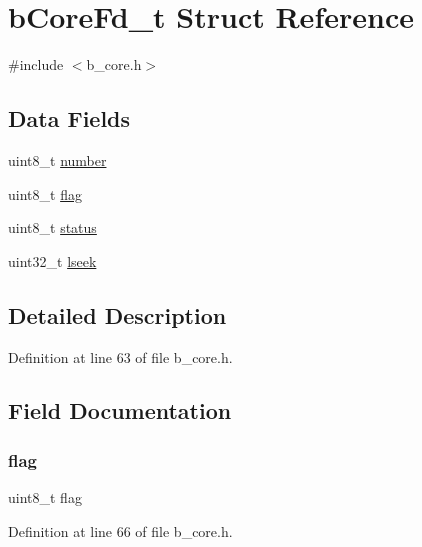 \hypertarget{structb_core_fd__t}{}\section{b\+Core\+Fd\+\_\+t Struct Reference}
\label{structb_core_fd__t}


{\ttfamily \#include $<$b\+\_\+core.\+h$>$}

\subsection*{Data Fields}
\begin{DoxyCompactItemize}
\item 
uint8\+\_\+t \mbox{\hyperlink{structb_core_fd__t_af57eaec6f3dec6de717735725c9908a6}{number}}
\item 
uint8\+\_\+t \mbox{\hyperlink{structb_core_fd__t_aff31312fb16705aa73c53b945a1a6b30}{flag}}
\item 
uint8\+\_\+t \mbox{\hyperlink{structb_core_fd__t_ade818037fd6c985038ff29656089758d}{status}}
\item 
uint32\+\_\+t \mbox{\hyperlink{structb_core_fd__t_a60011f40d336b1e91389c402d349fcc6}{lseek}}
\end{DoxyCompactItemize}


\subsection{Detailed Description}


Definition at line 63 of file b\+\_\+core.\+h.



\subsection{Field Documentation}
\mbox{\label{structb_core_fd__t_aff31312fb16705aa73c53b945a1a6b30}} 
\subsubsection{\texorpdfstring{flag}{flag}}
{\footnotesize\ttfamily uint8\+\_\+t flag}



Definition at line 66 of file b\+\_\+core.\+h.

\mbox{\label{structb_core_fd__t_a60011f40d336b1e91389c402d349fcc6}} 
